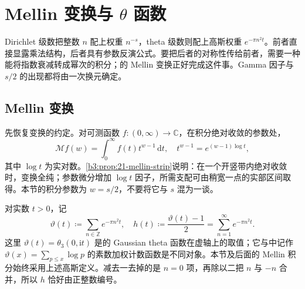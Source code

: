 \section{Mellin 变换与 \texorpdfstring{\(\theta\)}{\AnalysisPdfTheta} 函数}
\label{b3:sec:2602}

Dirichlet 级数把整数 \(n\) 配上权重 \(n^{-s}\)，theta 级数则配上高斯权重 \(e^{-\pi n^2t}\)。前者直接显露乘法结构，后者具有参数反演公式。要把后者的对称性传给前者，需要一种能将指数衰减转成幂次的积分；的 Mellin 变换正好完成这件事。Gamma 因子与 \(s/2\) 的出现都将由一次换元确定。

\subsection{Mellin 变换}
\label{b3:subsec:260201}

先恢复变换的约定。对可测函数 \(f:(0,\infty)\to\mathbb C\)，在积分绝对收敛的参数处，
\[
 \mathcal Mf(w)=\int_0^\infty f(t)t^{w-1}\,\mathrm dt,
 \quad t^{w-1}=e^{(w-1)\log t},
\]
其中 \(\log t\) 为实对数。\cref{b3:prop:21-mellin-strip}说明：在一个开竖带内绝对收敛时，变换全纯；参数微分增加 \(\log t\) 因子，所需支配可由稍宽一点的实部区间取得。本节的积分参数为 \(w=s/2\)，不要将它与 \(s\) 混为一谈。

\ProseParagraphBreak

对实数 \(t>0\)，记
\[
 \vartheta(t)\coloneqq\sum_{n\in\mathbb Z}e^{-\pi n^2t},
 \quad h(t)\coloneqq\frac{\vartheta(t)-1}{2}
                    =\sum_{n=1}^\infty e^{-\pi n^2t}.
\]
这里 \(\vartheta(t)=\theta_3(0,\mathrm it)\) 是的 Gaussian theta 函数在虚轴上的取值；它与中记作 \(\vartheta(x)=\sum_{p\le x}\log p\) 的素数加权计数函数是不同对象。本节及后面的 Mellin 积分始终采用上述高斯定义。减去一去掉的是 \(n=0\) 项，再除以二把 \(n\) 与 \(-n\) 合并，所以 \(h\) 恰好由正整数编号。

